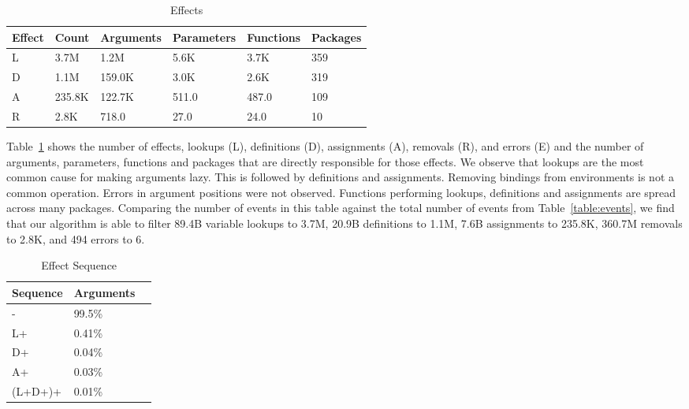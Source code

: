 \documentclass[review,nonacm,screen,acmsmall,anonymous=true]{acmart}
\begin{document}
\begin{table}[!h]
  \vspace{-3mm}
  \small
  \caption{Effects} \label{table:effects}
  \centering
  \begin{tabular}{llllll}
    \toprule
    \textbf{Effect}&\textbf{Count}&\textbf{Arguments}&\textbf{Parameters}&\textbf{Functions}&\textbf{Packages}\\
    \midrule
    L&3.7M&1.2M&5.6K&3.7K&359\\
    D&1.1M&159.0K&3.0K&2.6K&319\\
    A&235.8K&122.7K&511.0&487.0&109\\
    R&2.8K&718.0&27.0&24.0&10\\
    \bottomrule
  \end{tabular}
\end{table}

Table~\ref{table:effects} shows the number of effects, lookups (L), definitions
(D), assignments (A), removals (R), and errors (E) and the number of arguments,
parameters, functions and packages that are directly responsible for those
effects. We observe that lookups are the most common cause for making arguments
lazy. This is followed by definitions and assignments. Removing bindings from
environments is not a common operation. Errors in argument positions were not
observed. Functions performing lookups, definitions and assignments are spread
across many packages.
%
Comparing the number of events in this table against the total number of events
from Table~\ref{table:events}, we find that our algorithm is able to filter
89.4B variable lookups to 3.7M, 20.9B definitions to 1.1M, 7.6B assignments to
235.8K, 360.7M removals to 2.8K, and 494 errors to 6.

\begin{wraptable}{r}{4cm}
  \vspace{-3mm}
  \small
  \caption{Effect Sequence} \label{table:effectseq}
  \centering
  \begin{tabular}{lll}
    \toprule
    \textbf{Sequence}&\textbf{Arguments}\\
    \midrule
    -&99.5\%\\
    L+&0.41\%\\
    D+&0.04\%\\
    A+&0.03\%\\
    (L+D+)+&0.01\%\\
    \bottomrule
  \end{tabular}
\end{wraptable}
\end{document}
